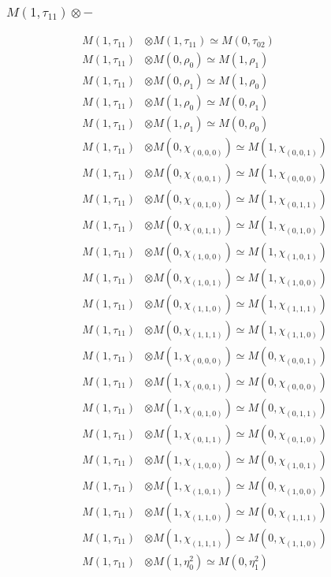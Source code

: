 \subsubsection{$ M(1,\tau_{11})\otimes -$}
\begin{align*}
M(1,\tau_{11}) &\otimes M(1,\tau_{11}) \simeq M(0,\tau_{02}) \\
M(1,\tau_{11}) &\otimes M(0,\rho_{0}) \simeq M(1,\rho_{1}) \\
M(1,\tau_{11}) &\otimes M(0,\rho_{1}) \simeq M(1,\rho_{0}) \\
M(1,\tau_{11}) &\otimes M(1,\rho_{0}) \simeq M(0,\rho_{1}) \\
M(1,\tau_{11}) &\otimes M(1,\rho_{1}) \simeq M(0,\rho_{0}) \\
M(1,\tau_{11}) &\otimes M(0,\chi_{(0,0,0)}) \simeq M(1,\chi_{(0,0,1)}) \\
M(1,\tau_{11}) &\otimes M(0,\chi_{(0,0,1)}) \simeq M(1,\chi_{(0,0,0)}) \\
M(1,\tau_{11}) &\otimes M(0,\chi_{(0,1,0)}) \simeq M(1,\chi_{(0,1,1)}) \\
M(1,\tau_{11}) &\otimes M(0,\chi_{(0,1,1)}) \simeq M(1,\chi_{(0,1,0)}) \\
M(1,\tau_{11}) &\otimes M(0,\chi_{(1,0,0)}) \simeq M(1,\chi_{(1,0,1)}) \\
M(1,\tau_{11}) &\otimes M(0,\chi_{(1,0,1)}) \simeq M(1,\chi_{(1,0,0)}) \\
M(1,\tau_{11}) &\otimes M(0,\chi_{(1,1,0)}) \simeq M(1,\chi_{(1,1,1)}) \\
M(1,\tau_{11}) &\otimes M(0,\chi_{(1,1,1)}) \simeq M(1,\chi_{(1,1,0)}) \\
M(1,\tau_{11}) &\otimes M(1,\chi_{(0,0,0)}) \simeq M(0,\chi_{(0,0,1)}) \\
M(1,\tau_{11}) &\otimes M(1,\chi_{(0,0,1)}) \simeq M(0,\chi_{(0,0,0)}) \\
M(1,\tau_{11}) &\otimes M(1,\chi_{(0,1,0)}) \simeq M(0,\chi_{(0,1,1)}) \\
M(1,\tau_{11}) &\otimes M(1,\chi_{(0,1,1)}) \simeq M(0,\chi_{(0,1,0)}) \\
M(1,\tau_{11}) &\otimes M(1,\chi_{(1,0,0)}) \simeq M(0,\chi_{(1,0,1)}) \\
M(1,\tau_{11}) &\otimes M(1,\chi_{(1,0,1)}) \simeq M(0,\chi_{(1,0,0)}) \\
M(1,\tau_{11}) &\otimes M(1,\chi_{(1,1,0)}) \simeq M(0,\chi_{(1,1,1)}) \\
M(1,\tau_{11}) &\otimes M(1,\chi_{(1,1,1)}) \simeq M(0,\chi_{(1,1,0)}) \\
M(1,\tau_{11}) &\otimes M(1,\eta^{2}_{0}) \simeq M(0,\eta^{2}_{1}) \\

\end{align*}
